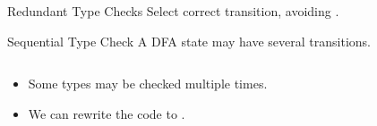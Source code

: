 
{  %

\begin{frame}{ Redundant Type Checks}
  Select correct transition, avoiding .

  \medskip

  \scalebox{0.85}{}
\end{frame}
}



\begin{frame}[t]{Sequential Type Check}
  A DFA state may have several  transitions.
  \begin{columns}
    \begin{column}{0.5\textwidth}
      \scalebox{0.9}{}
    \end{column}
    \begin{column}{0.5\textwidth}  %
    \end{column}
  \end{columns}

  \begin{itemize}
  \item<1->{Some types may be checked multiple times.}
  \item<2>{We can rewrite the code to .}
  \end{itemize}

\end{frame}
